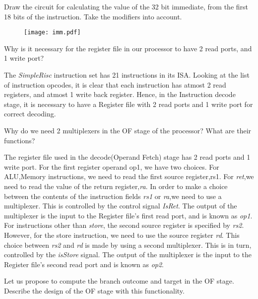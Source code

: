 \begin{ExerciseList}
\Exercise Draw the circuit for calculating the value of the 32 bit immediate, from
the first 18 bits of the instruction. Take the modifiers into account.

\begin{figure}[H]
  \centering
  \texttt{[image: imm.pdf]}
\end{figure}

\Exercise Why is it necessary for the register file in our \simplerisc processor
to have 2 read ports, and 1 write port?

\Answer
The \textit{SimpleRisc} instruction set has 21 instructions in its ISA. Looking at the list of instruction opcodes, it is clear that each instruction has atmost 2 read registers, and atmost 1 write back register. Hence, in the Instruction decode stage, it is necessary to have a Register file with 2 read ports and 1 write port for correct decoding.

\Exercise Why do we need 2 multiplexers in the OF stage of the processor? What are their
functions?

\Answer
The register file used in the decode(Operand Fetch) stage has 2 read ports and 1 write port. For the first register operand op1, we have two choices. For ALU,Memory instructions, we need to read the first source register,rs1. For \textit{ret},we need to read the value of the return register,\textit{ra}. In order to make a choice between the contents of the instruction fields \textit{rs1} or \textit{ra},we need to use a multiplexer. This is controlled by the control signal \textit{IsRet}. The output of the multiplexer is the input to the Register file's first read port, and is known as \textit{op1}.\newline
For instructions other than \textit{store}, the second source register is specified by \textit{rs2}. However, for the store instruction, we need to use the source register \textit{rd}. This choice between \textit{rs2} and \textit{rd} is made by using a second multiplexer. This is in turn, controlled by the \textit{isStore} signal. The output of the multiplexer is the input to the Register file's second read port and is known as \textit{op2}. \newline

\Exercise
Let us propose to compute the branch outcome and target in the OF stage. Describe the
design of the OF stage with this functionality.


\end{ExerciseList}
